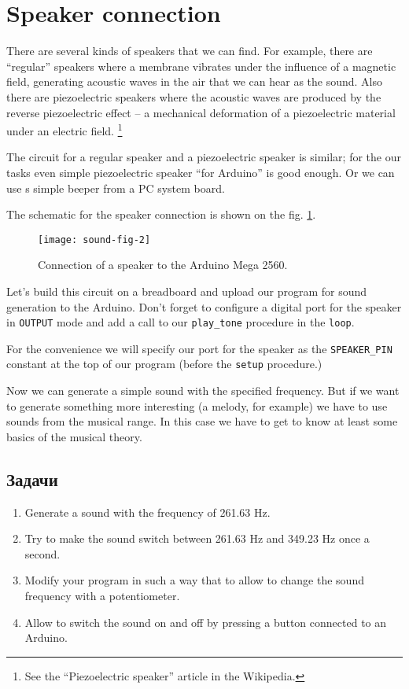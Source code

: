\documentclass[../sparc.tex]{subfiles}
\begin{document}
\section{Speaker connection}

There are several kinds of speakers that we can find.  For example, there are
``regular'' speakers where a membrane vibrates under the influence of a magnetic
field, generating acoustic waves in the air that we can hear as the sound.  Also
there are piezoelectric speakers where the acoustic waves are produced by the
reverse piezoelectric effect -- a mechanical deformation of a piezoelectric
material under an electric field. \footnote{See the ``Piezoelectric speaker''
article in the Wikipedia.}

The circuit for a regular speaker and a piezoelectric speaker is similar; for
the our tasks even simple piezoelectric speaker ``for Arduino'' is good enough.
Or we can use s simple beeper from a PC system board.

The schematic for the speaker connection is shown on the
fig. \ref{fig:sound-fig-2}.

\begin{figure}[h]
  \centering
  \texttt{[image: sound-fig-2]}
  \caption{Connection of a speaker to the Arduino Mega 2560.}
  \label{fig:sound-fig-2}
\end{figure}

Let's build this circuit on a breadboard and upload our program for sound
generation to the Arduino.  Don't forget to configure a digital port for the
speaker in \texttt{OUTPUT} mode and add a call to our \texttt{play\_tone}
procedure in the \texttt{loop}.

For the convenience we will specify our port for the speaker as the
\texttt{SPEAKER\_PIN} constant at the top of our program (before the
\texttt{setup} procedure.)

Now we can generate a simple sound with the specified frequency.  But if we want
to generate something more interesting (a melody, for example) we have to use
sounds from the musical range.  In this case we have to get to know at least
some basics of the musical theory.

\subsection{Задачи}
\begin{enumerate}
\item Generate a sound with the frequency of 261.63 Hz.
\item Try to make the sound switch between 261.63 Hz and 349.23 Hz once a
  second.
\item Modify your program in such a way that to allow to change the sound
  frequency with a potentiometer.
\item Allow to switch the sound on and off by pressing a button connected to an
  Arduino.
\end{enumerate}
\end{document}
